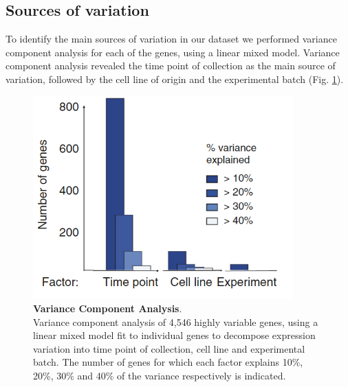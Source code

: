 \newpage

\subsection{Sources of variation} 
\label{sec:endodiff_sources_of_variation}


To identify the main sources of variation in our dataset we performed variance component analysis for each of the genes, using a linear mixed model.
Variance component analysis revealed the time point of collection as the main source of variation, followed by the cell line of origin and the experimental batch (Fig. \ref{fig:endodiff_vca}).\\

\begin{figure}[h]
\includegraphics[width=10cm]{Chapter4/Fig/endodiff_variance_component.png}
\caption[Variance Component Analysis]{\textbf{Variance Component Analysis}.\\
Variance component analysis of 4,546 highly variable genes, using a linear mixed model fit to individual genes to decompose expression variation into
time point of collection, cell line and experimental batch.
The number of genes for which each factor explains 10\%, 20\%, 30\% and 40\% of the variance respectively is indicated.}
\label{fig:endodiff_vca}
\end{figure}

